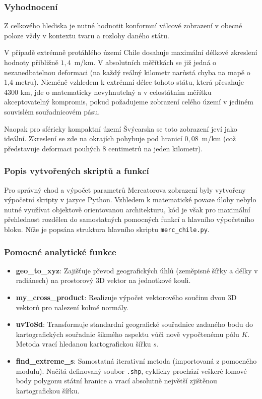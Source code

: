 \documentclass[12pt, a4paper]{article}
\begin{document}
\subsubsection{Vyhodnocení} 

Z celkového hlediska je nutné hodnotit konformní válcové zobrazení v obecné poloze vždy v kontextu tvaru a rozlohy daného státu. 

V případě extrémně protáhlého území Chile dosahuje maximální délkové zkreslení hodnoty přibližně $1,4$~m/km. V absolutních měřítkách se již jedná o nezanedbatelnou deformaci (na každý reálný kilometr narůstá chyba na mapě o 1,4 metru). Nicméně vzhledem k extrémní délce tohoto státu, která přesahuje 4300 km, jde o matematicky nevyhnutelný a v celostátním měřítku akceptovatelný kompromis, pokud požadujeme zobrazení celého území v jediném souvislém souřadnicovém pásu. 

Naopak pro sféricky kompaktní území Švýcarska se toto zobrazení jeví jako ideální. Zkreslení se zde na okrajích pohybuje pod hranicí $0,08$~m/km (což představuje deformaci pouhých 8 centimetrů na jeden kilometr).

\subsubsection{Popis vytvořených skriptů a funkcí}

Pro správný chod a výpočet parametrů Mercatorova zobrazení byly vytvořeny výpočetní skripty v jazyce Python. Vzhledem k matematické povaze úlohy nebylo nutné využívat objektově orientovanou architekturu, kód je však pro maximální přehlednost rozdělen do samostatných pomocných funkcí a hlavního výpočetního bloku. Níže je popsána struktura hlavního skriptu \texttt{merc\_chile.py}.

\subsubsection{Pomocné analytické funkce}

\begin{itemize}
    \item \textbf{geo\_to\_xyz}: Zajišťuje převod geografických úhlů (zeměpisné šířky a délky v radiánech) na prostorový 3D vektor na jednotkové kouli.
    
    \item \textbf{my\_cross\_product}: Realizuje výpočet vektorového součinu dvou 3D vektorů pro nalezení kolmé normály.
    
    \item \textbf{uvToSd}: Transformuje standardní geografické souřadnice zadaného bodu do kartografických souřadnic šikmého aspektu vůči nově vypočtenému pólu $K$. Metoda vrací hledanou kartografickou šířku $s$.
    
    \item \textbf{find\_extreme\_s}: Samostatná iterativní metoda (importovaná z pomocného modulu). Načítá definovaný soubor \texttt{.shp}, cyklicky prochází veškeré lomové body polygonu státní hranice a vrací absolutně největší zjištěnou kartografickou šířku.
\end{itemize}
\end{document}
